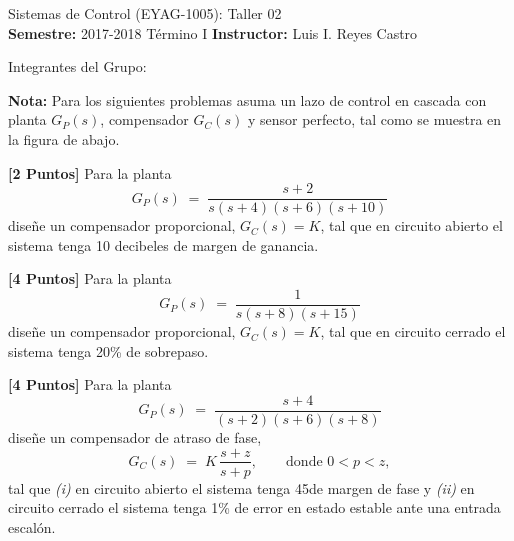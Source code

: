 \documentclass[ a4paper, twoside, 11pt]{article}
\newcommand{\numero}{02}
\begin{document}
\allowdisplaybreaks

\begin{center}
\Large Sistemas de Control (EYAG-1005): Taller \numero \\[1ex]
\small \textbf{Semestre:} 2017-2018 T\'ermino I \qquad
\textbf{Instructor:} Luis I. Reyes Castro
\end{center}
\halfskip

Integrantes del Grupo:
\fullskip
\fullskip
\fullskip

\textbf{Nota:} Para los siguientes problemas asuma un lazo de control en cascada con planta $G_P(s)$, compensador $G_C(s)$ y sensor perfecto, tal como se muestra en la figura de abajo. 

\begin{figure}[htb]
\centering
\def\svgwidth{0.8\columnwidth}

\end{figure}
\fullskip

\begin{problem}
\textbf{[2 Puntos]} Para la planta 
\[
G_P(s) \; = \; 
\frac{s+2}{s(s+4)(s+6)(s+10)}
\]
dise\~ne un compensador proporcional, \ie $G_C(s) = K$, tal que en circuito abierto el sistema tenga 10 decibeles de margen de ganancia. 

\end{problem}
\fullskip

\begin{problem}
\textbf{[4 Puntos]} Para la planta 
\[
G_P(s) \; = \; 
\frac{1}{s(s+8)(s+15)}
\]
dise\~ne un compensador proporcional, \ie $G_C(s) = K$, tal que en circuito cerrado el sistema tenga 20\% de sobrepaso. 

\end{problem}
\fullskip

\begin{problem}
\textbf{[4 Puntos]} Para la planta 
\[
G_P(s) \; = \; 
\frac{s+4}{(s+2)(s+6)(s+8)}
\]
dise\~ne un compensador de atraso de fase, \ie
\[
G_C(s) \; = \; K \, \frac{s+z}{s+p}, 
\qquad \text{donde } 0 < p < z,
\]
tal que \emph{(i)} en circuito abierto el sistema tenga 45\deg de margen de fase y \emph{(ii)} en circuito cerrado el sistema tenga 1\% de error en estado estable ante una entrada escal\'on. 

\end{problem}
\fullskip
\end{document}
